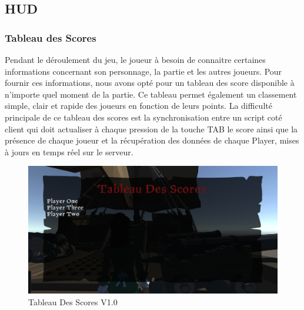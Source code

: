 \newpage
\subsection{HUD}
    
    \subsubsection{Tableau des Scores}
    Pendant le déroulement du jeu, le joueur à besoin de connaitre certaines informations concernant son personnage, la partie et les autres joueurs. 
    Pour fournir ces informations, nous avons opté pour un tableau des score disponible à n’importe quel moment de la partie. Ce tableau permet également un classement simple, clair et rapide des joueurs en fonction de leurs points.
    La difficulté principale de ce tableau des scores est la synchronisation entre un script coté client qui doit actualiser à chaque pression de la touche TAB le score ainsi que la présence de chaque joueur et la récupération des données de chaque Player, mises à jours en temps réel sur le serveur.
    \begin{figure}[hbt!]
            \centering
            \includegraphics[scale=0.3]{img/scoreboard.PNG}
            \caption{Tableau Des Scores V1.0}
    \end{figure}
    
    
    
